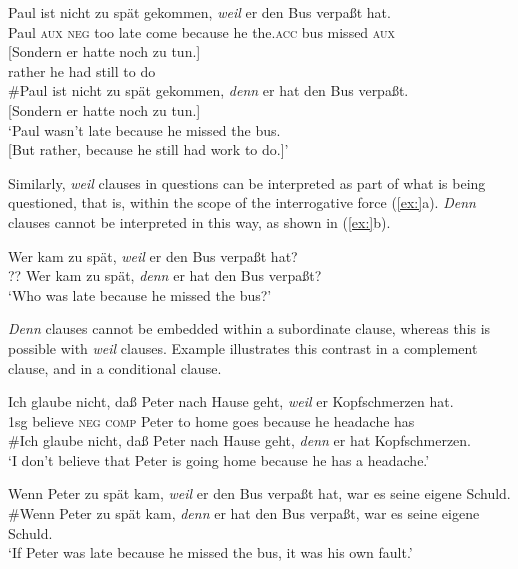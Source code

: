 \ea
\ea \gll  Paul  ist  nicht  zu  spät  gekommen,  \textit{weil}  er  den  Bus  verpaßt  hat.\\
Paul  \textsc{aux}  \textsc{neg}  too  late  come  because  he  the.\textsc{acc}  bus  missed  \textsc{aux}\\
\gll   {}[Sondern  er  hatte  noch  zu  tun.]\\
  rather  he  had  still  to  do\\
\ex  \#Paul ist nicht zu spät gekommen, \textit{denn} er hat den Bus verpaßt.\\
  {}[Sondern er hatte noch zu tun.]\\
\glt ‘Paul wasn’t late because he missed the bus.\\
{}[But rather, because he still had work to do.]’
\z \z


Similarly, \textit{weil} clauses in questions can be interpreted as part of what is being questioned, that is, within the scope of the interrogative force (\ref{ex:}a). \textit{Denn} clauses cannot be interpreted in this way, as shown in (\ref{ex:}b).


\ea
\ea Wer kam zu spät, \textit{weil} er den Bus verpaßt hat?\\
\ex ?? Wer kam zu spät, \textit{denn} er hat den Bus verpaßt?\\
\glt ‘Who was late because he missed the bus?’
                       \z
\z


\textit{Denn} clauses cannot be embedded within a subordinate clause, whereas this is possible with \textit{weil} clauses. Example  illustrates this contrast in a complement clause, and  in a conditional clause.


\ea
\ea  \gll Ich  glaube  nicht,  daß  Peter  nach  Hause  geht,  \textit{weil}  er  Kopfschmerzen  hat.\\
1sg  believe  \textsc{neg}  \textsc{comp}  Peter  to  home  goes  because  he  headache  has\\
\ex  \#Ich glaube nicht, daß Peter nach Hause geht, \textit{denn} er hat Kopfschmerzen.\\
\glt ‘I don’t believe that Peter is going home because he has a headache.’
\z \z

\ea
\ea Wenn Peter zu spät kam, \textit{weil} er den Bus verpaßt hat, war es seine eigene Schuld.\\
\ex \#Wenn Peter zu spät kam, \textit{denn} er hat den Bus verpaßt, war es seine eigene Schuld.\\
\glt ‘If Peter was late because he missed the bus, it was his own fault.’
\z \z


